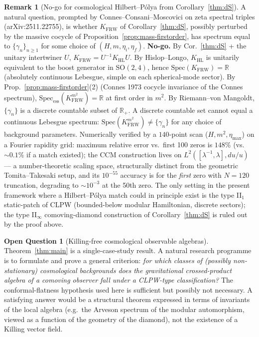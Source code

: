 \documentclass[11pt]{article}
\theoremstyle{definition}
\newtheorem{remark}[theorem]{Remark}
\newtheorem{question}[theorem]{Open Question}
\newcommand{\R}{\mathbb{R}}
\newcommand{\HL}{\mathrm{HL}}
\newcommand{\FRW}{\mathrm{FRW}}
\begin{document}
\begin{remark}[No-go for cosmological Hilbert--P\'olya from Corollary~\ref{thm:dS}]\label{rmk:no-rh}
A natural question, prompted by Connes--Consani--Moscovici on zeta spectral triples (arXiv:2511.22755), is whether $K_{\FRW}$ of Corollary~\ref{thm:dS}, possibly perturbed by the massive cocycle of Proposition~\ref{prop:mass-firstorder}, has spectrum equal to $\{\gamma_n\}_{n\ge 1}$ for some choice of $(H, m, \eta_i, \eta_f)$. \textbf{No-go.} By Cor.~\ref{thm:dS} + the unitary intertwiner $U$, $K_{\FRW} = U^{-1} K_\HL U$. By Hislop--Longo, $K_\HL$ is unitarily equivalent to the boost generator in $\mathrm{SO}(2,4)$, hence $\mathrm{Spec}(K_{\FRW}) = \R$ (absolutely continuous Lebesgue, simple on each spherical-mode sector). By Prop.~\ref{prop:mass-firstorder}(2) (Connes 1973 cocycle invariance of the Connes spectrum), $\mathrm{Spec}_{\mathrm{ess}}(K_{\FRW}^{m^2}) = \R$ at first order in $m^2$. By Riemann--von Mangoldt, $\{\gamma_n\}$ is a discrete countable subset of $\R_+$. A discrete countable set cannot equal a continuous Lebesgue spectrum: $\mathrm{Spec}(K_{\FRW}^{m^2}) \neq \{\gamma_n\}$ for any choice of background parameters. Numerically verified by a $140$-point scan ($H, m^2, \eta_{\max}$) on a Fourier rapidity grid: maximum relative error vs.\ first 100 zeros is $148\%$ (vs.\ $\sim 0.1\%$ if a match existed); the CCM construction lives on $L^2([\lambda^{-1},\lambda], du/u)$ — a number-theoretic scaling space, structurally distinct from the geometric Tomita--Takesaki setup, and its $10^{-55}$ accuracy is for the \emph{first} zero with $N=120$ truncation, degrading to $\sim 10^{-3}$ at the 50th zero. The only setting in the present framework where a Hilbert--P\'olya match could in principle exist is the type II$_1$ static-patch of CLPW (bounded-below modular Hamiltonian, discrete sectors); the type II$_\infty$ comoving-diamond construction of Corollary~\ref{thm:dS} is ruled out by the proof above.
\end{remark}

\begin{question}[Killing-free cosmological observable algebras]
Theorem~\ref{thm:main} is a single-case-study result. A natural research programme is to formulate and prove a general criterion: \emph{for which classes of (possibly non-stationary) cosmological backgrounds does the gravitational crossed-product algebra of a comoving observer fall under a CLPW-type classification?} The conformal-flatness hypothesis used here is sufficient but possibly not necessary. A satisfying answer would be a structural theorem expressed in terms of invariants of the local algebra (e.g.\ the Arveson spectrum of the modular automorphism, viewed as a function of the geometry of the diamond), not the existence of a Killing vector field.
\end{question}
\end{document}
